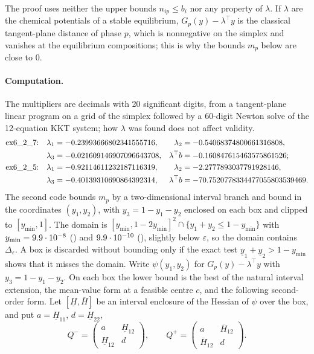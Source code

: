 The proof uses neither the upper bounds $n_{ip}\le b_i$ nor any property of $\lambda$.
If $\lambda$ are the chemical potentials of a stable equilibrium, $G_p(y)-\lambda^\top y$ is the classical tangent-plane distance of phase $p$, which is nonnegative on the simplex and vanishes at the equilibrium compositions; this is why the bounds $m_p$ below are close to $0$.

\paragraph{Computation.}
The multipliers are decimals with 20 significant digits, from a tangent-plane linear program on a grid of the simplex followed by a 60-digit Newton solve of the 12-equation KKT system;
how $\lambda$ was found does not affect validity.
\begin{align*}
\text{\inst{ex6_2_7}:}\quad \lambda_1&=-0.23993666802341555716, & \lambda_2&=-0.54068374800661316808,\\
\lambda_3&=-0.021609146907096643708, & \lambda^\top b&=-0.160847615463575861526;\\
\text{\inst{ex6_2_5}:}\quad \lambda_1&=-0.92114611232187116319, & \lambda_2&=-2.2777893037791928146,\\
\lambda_3&=-0.40139310690864392314, & \lambda^\top b&=-70.7520778334477055803539469 .
\end{align*}
The second code bounds $m_p$ by a two-dimensional interval branch and bound in the coordinates $(y_1,y_2)$, with $y_3=1-y_1-y_2$ enclosed on each box and clipped to $[y_{\min},1]$.
The domain is $[y_{\min},1-2y_{\min}]^2\cap\{y_1+y_2\le1-y_{\min}\}$ with $y_{\min}=9.9\cdot 10^{-8}$ () and $9.9\cdot 10^{-10}$ (), slightly below $\varepsilon$, so the domain contains $\Delta_\varepsilon$.
A box is discarded without bounding only if the exact test $\underline{y}_1+\underline{y}_2>1-y_{\min}$ shows that it misses the domain.
Write $\psi(y_1,y_2)$ for $G_p(y)-\lambda^\top y$ with $y_3=1-y_1-y_2$.
On each box the lower bound is the best of the natural interval extension, the mean-value form at a feasible centre $c$, and the following second-order form.
Let $[\underline H,\overline H]$ be an interval enclosure of the Hessian of $\psi$ over the box, and put $a=\underline H_{11}$, $d=\underline H_{22}$,
\[
Q^-=\begin{pmatrix}a&\underline H_{12}\\ \underline H_{12}&d\end{pmatrix},\qquad Q^+=\begin{pmatrix}a&\overline H_{12}\\ \overline H_{12}&d\end{pmatrix}.
\]
